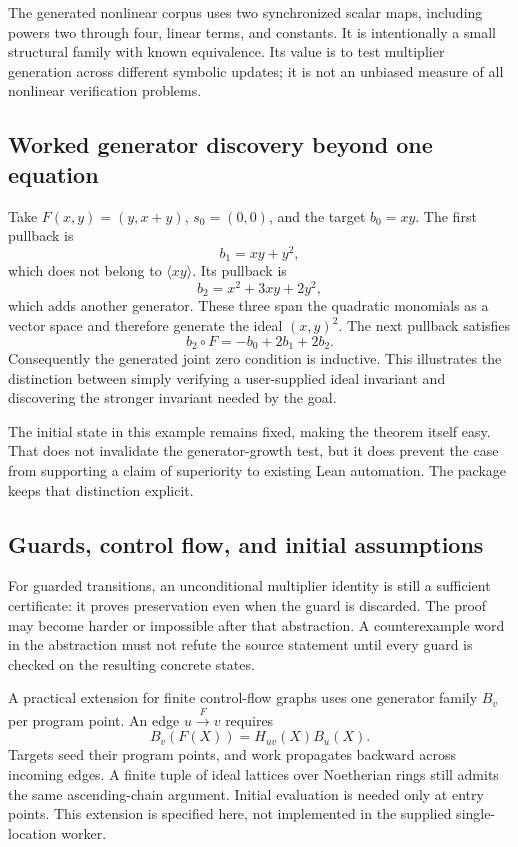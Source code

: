 The generated nonlinear corpus uses two synchronized scalar maps, including powers two through four, linear terms, and constants. It is intentionally a small structural family with known equivalence. Its value is to test multiplier generation across different symbolic updates; it is not an unbiased measure of all nonlinear verification problems.

\subsection{Worked generator discovery beyond one equation}

Take $F(x,y)=(y,x+y)$, $s_0=(0,0)$, and the target $b_0=xy$. The first pullback is
\[
 b_1=xy+y^2,
\]
which does not belong to $\langle xy\rangle$. Its pullback is
\[
 b_2=x^2+3xy+2y^2,
\]
which adds another generator. These three span the quadratic monomials as a vector space and therefore generate the ideal $(x,y)^2$. The next pullback satisfies
\[
 b_2\circ F=-b_0+2b_1+2b_2.
\]
Consequently the generated joint zero condition is inductive. This illustrates the distinction between simply verifying a user-supplied ideal invariant and discovering the stronger invariant needed by the goal.

The initial state in this example remains fixed, making the theorem itself easy. That does not invalidate the generator-growth test, but it does prevent the case from supporting a claim of superiority to existing Lean automation. The package keeps that distinction explicit.

\subsection{Guards, control flow, and initial assumptions}

For guarded transitions, an unconditional multiplier identity is still a sufficient certificate: it proves preservation even when the guard is discarded. The proof may become harder or impossible after that abstraction. A counterexample word in the abstraction must not refute the source statement until every guard is checked on the resulting concrete states.

A practical extension for finite control-flow graphs uses one generator family $B_v$ per program point. An edge $u\xrightarrow{F}v$ requires
\[
 B_v(F(X))=H_{uv}(X)B_u(X).
\]
Targets seed their program points, and work propagates backward across incoming edges. A finite tuple of ideal lattices over Noetherian rings still admits the same ascending-chain argument. Initial evaluation is needed only at entry points. This extension is specified here, not implemented in the supplied single-location worker.

